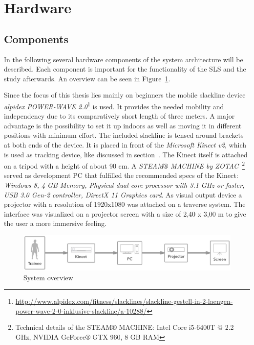 \section{Hardware}\label{5_1_systemSetup}
\subsection{Components}\label{5_1_hardwareComponents}
In the following several hardware components of the system architecture will be described. Each component is important for the functionality of the SLS and the study afterwards. An overview can be seen in Figure~\ref{fig:5_3_systemArchitecture}.

Since the focus of this thesis lies mainly on beginners the mobile slackline device \textit{alpidex POWER-WAVE 2.0}\footnote{\url{http://www.alpidex.com/fitness/slacklines/slackline-gestell-in-2-laengen-power-wave-2-0-inklusive-slackline/a-10288/}} is used.
It provides the needed mobility and independency due to its comparatively short length of three meters.
A major advantage is the possibility to set it up indoors as well as moving it in different positions with minimum effort.
The included slackline is tensed around brackets at both ends of the device.
It is placed in front of the \textit{Microsoft Kinect v2}, which is used as tracking device, like discussed in section~\textit{}. The Kinect itself is attached on a tripod with a height of about 90 cm.
A \textit{STEAM® MACHINE by ZOTAC}~\footnote{Technical details of the STEAM® MACHINE: Intel Core i5-6400T @ 2.2 GHz, NVIDIA GeForce® GTX 960, 8 GB RAM} served as development PC that fulfilled the recommended specs of the Kinect: \textit{Windows 8, 4 GB Memory, Physical dual-core processor with 3.1 GHz or faster, USB 3.0 Gen-2 controller, DirectX 11 Graphics card}. As visual output device a projector with a resolution of 1920x1080 was attached on a traverse system.
The interface was visualized on a projector screen with a size of 2,40 x 3,00 m to give the user a more immersive feeling.

\begin{figure}[htb]
	\centering
	\begin{minipage}[t]{1\linewidth}
		\centering
		\includegraphics[width=1\linewidth]{Pictures/5_3_systemArchitecture}
		\caption{System overview }
		\label{fig:5_3_systemArchitecture}
	\end{minipage}
\end{figure}

